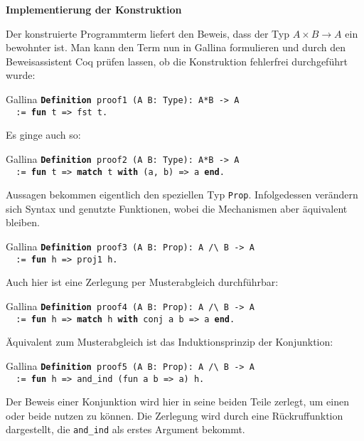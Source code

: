 \documentclass[8pt]{beamer}
\newcommand{\strong}[1]{\textsf{\textbf{#1}}}
\newcommand{\parspace}{\vspace{0.8em}}
\newcommand{\kw}[1]{\textbf{#1}}
\begin{document}
\begin{frame}[t]
\strong{Implementierung der Konstruktion}

\vspace{4em}
Der konstruierte Programmterm liefert den Beweis, dass der Typ
$A\times B\to A$ ein bewohnter ist. Man kann den Term nun in
Gallina formulieren und durch den Beweisassistent Coq prüfen lassen,
ob die Konstruktion fehlerfrei durchgeführt wurde:\pause

\begin{block}{Gallina}
\texttt{\kw{Definition} proof1 (A B: Type): A*B -> A\\
\ \ := \kw{fun} t => fst t.}
\end{block}\pause

\parspace
Es ginge auch so:
\begin{block}{Gallina}
\texttt{\kw{Definition} proof2 (A B: Type): A*B -> A\\
\ \ := \kw{fun} t => \kw{match} t \kw{with} (a, b) => a \kw{end}.}
\end{block}
\end{frame}

\begin{frame}
Aussagen bekommen eigentlich den speziellen Typ \texttt{Prop}.
Infolgedessen verändern sich Syntax und genutzte Funktionen,
wobei die Mechanismen aber äquivalent bleiben.
\begin{block}{Gallina}
\texttt{\kw{Definition} proof3 (A B: Prop): A /{\textbackslash} B -> A\\
\ \ := \kw{fun} h => proj1 h.}
\end{block}\pause
Auch hier ist eine Zerlegung per Musterabgleich durchführbar:
\begin{block}{Gallina}
\texttt{\kw{Definition} proof4 (A B: Prop): A /{\textbackslash} B -> A\\
\ \ := \kw{fun} h => \kw{match} h \kw{with} conj a b => a \kw{end}.}
\end{block}\pause
Äquivalent zum Musterabgleich ist das Induktionsprinzip der Konjunktion:
\begin{block}{Gallina}
\texttt{\kw{Definition} proof5 (A B: Prop): A /{\textbackslash} B -> A\\
\ \ := \kw{fun} h => and\_ind (fun a b => a) h.}
\end{block}
Der Beweis einer Konjunktion wird hier in seine beiden Teile zerlegt,
um einen oder beide nutzen zu können. Die Zerlegung wird durch eine
Rückruffunktion dargestellt, die \texttt{and\_ind} als erstes Argument
bekommt.
\end{frame}
\end{document}
